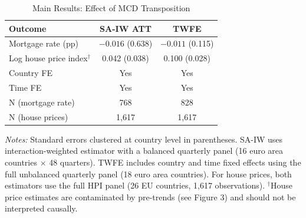 \begin{table}[!h]
\centering
\caption{Main Results: Effect of MCD Transposition}
\label{tab:main_results}
\begin{tabular}[t]{lcc}
\toprule
Outcome & SA-IW ATT & TWFE\\
\midrule
Mortgage rate (pp) & $-0.016$ (0.638) & $-0.011$ (0.115)\\
Log house price index$^{\dagger}$ & 0.042 (0.038) & 0.100 (0.028)\\
\midrule
Country FE & Yes & Yes\\
Time FE & Yes & Yes\\
N (mortgage rate) & 768 & 828\\
N (house prices) & 1,617 & 1,617\\
\bottomrule
\end{tabular}
\par\vspace{0.3em}
{\footnotesize \textit{Notes:} Standard errors clustered at country level in parentheses. SA-IW uses \citet{sun_abraham_2021} interaction-weighted estimator with a balanced quarterly panel (16 euro area countries $\times$ 48 quarters). TWFE includes country and time fixed effects using the full unbalanced quarterly panel (18 euro area countries). For house prices, both estimators use the full HPI panel (26 EU countries, 1,617 observations). $^{\dagger}$House price estimates are contaminated by pre-trends (see Figure 3) and should not be interpreted causally.}
\end{table}
